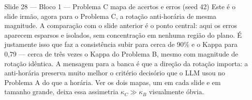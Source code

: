 \documentclass[aspectratio=169,10pt]{beamer}
\begin{document}
\begin{frame}{Slide 28 --- Bloco 1 --- Problema C mapa de acertos e erros (seed 42)}
\footnotesize
Este \'e o slide irm\~ao, agora para o Problema C, a rota\c{c}\~ao anti-hor\'aria de mesma magnitude. A compara\c{c}\~ao com o slide anterior \'e o ponto central: aqui os erros aparecem esparsos e isolados, sem concentra\c{c}\~ao em nenhuma regi\~ao do plano. \'E justamente isso que faz a consist\^encia subir para cerca de 90\% e o Kappa para 0,79 --- cerca de tr\^es vezes o Kappa do Problema B, mesmo com magnitude de rota\c{c}\~ao id\^entica. A mensagem para a banca \'e que a dire\c{c}\~ao da rota\c{c}\~ao importa: a anti-hor\'aria preserva muito melhor o crit\'erio decis\'orio que o LLM usou no Problema A do que a hor\'aria. Ver os dois mapas, um em cada slide e em tamanho grande, deixa essa assimetria $\kappa_C \gg \kappa_B$ visualmente \'obvia.
\end{frame}
\end{document}
